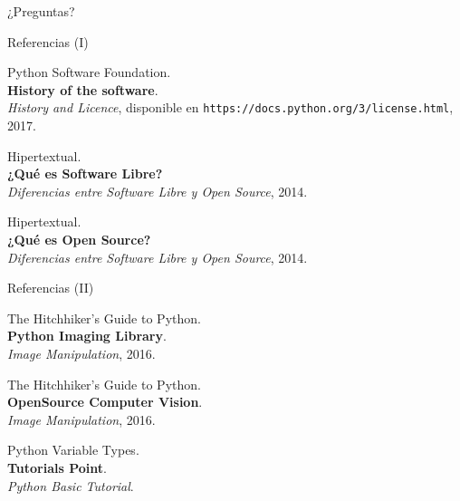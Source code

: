 \documentclass[usenames,dvipsnames]{beamer}
\begin{document}
  \begin{frame}[standout]
    ¿Preguntas?
  \end{frame}

  \begin{frame}{Referencias (I)}
    \begin{enumerate}[{[}1{]}]
      \item Python Software Foundation.\\
      \textbf{History of the software}.\\
      \textit{History and Licence},
      disponible en \texttt{https://docs.python.org/3/license.html}, 2017.

      \item Hipertextual.\\
      \textbf{¿Qué es Software Libre?}\\
      \textit{Diferencias entre Software Libre y Open Source}, 2014.

      \item Hipertextual.\\
      \textbf{¿Qué es Open Source?}\\
      \textit{Diferencias entre Software Libre y Open Source}, 2014.
    \end{enumerate}
  \end{frame}

  \begin{frame}{Referencias (II)}
    \begin{enumerate}[{[}1{]}]
      \addtocounter{enumi}{3}

      \item The Hitchhiker's Guide to Python.\\
      \textbf{Python Imaging Library}.\\
      \textit{Image Manipulation}, 2016.

      \item The Hitchhiker's Guide to Python.\\
      \textbf{OpenSource Computer Vision}.\\
      \textit{Image Manipulation}, 2016.

      \item Python Variable Types.\\
      \textbf{Tutorials Point}.\\
      \textit{Python Basic Tutorial}.
    \end{enumerate}
  \end{frame}
\end{document}
